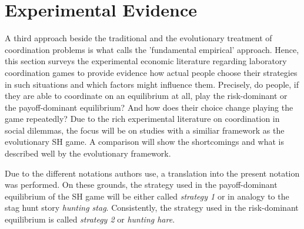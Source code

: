 \documentclass[11pt]{article}
\begin{document}
\section{Experimental Evidence}
\label{sec:experimentalevidence}
A third approach beside the traditional and the evolutionary treatment of 
coordination problems is what \textcite{camerer_behavioral_2003} calls the 
'fundamental empirical' approach.
Hence, this section surveys the experimental economic literature regarding 
laboratory coordination games to provide evidence how actual people choose
their strategies in such situations and which factors might influence them. 
Precisely, do people, if they are able to coordinate on an equilibrium at all,
play the risk-dominant or the payoff-dominant equilibrium? And how does their
choice change playing the game repeatedly?
Due to the rich experimental literature on coordination in social 
dilemmas, the focus will be on studies with a similiar framework as the
evolutionary SH game. A comparison will show the shortcomings and what
is described well by the evolutionary framework.
 
Due to the different notations authors use, a translation into the present
notation was performed.
On these grounds, the 
strategy used in the payoff-dominant equilibrium of the SH game will be 
either called  \textit{strategy 1} or in analogy to the stag hunt story 
\textit{hunting stag}.
Consistently, the strategy used in the risk-dominant equilibrium is called
\textit{strategy 2} or \textit{hunting hare}. 
\end{document}
